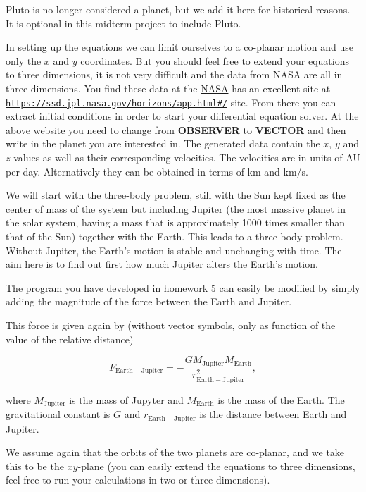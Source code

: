 \documentclass[%
oneside,                 %
final,                   %
10pt]{article}
\begin{document}
\noindent
Pluto is no longer considered a planet, but we add it here for
historical reasons. It is optional in this midterm project to include
Pluto.

In setting up the equations we can limit ourselves to a co-planar
motion and use only the $x$ and $y$ coordinates. But you should feel
free to extend your equations to three dimensions, it is not very
difficult and the data from NASA are all in three dimensions.
You find these data at the 
\href{{http://www.nasa.gov/index.html}}{NASA} has an excellent site at \href{{https://ssd.jpl.nasa.gov/horizons/app.html#/}}{\nolinkurl{https://ssd.jpl.nasa.gov/horizons/app.html\#/}} site.
From there you can extract initial conditions in order to start your
differential equation solver.  At the above website you need to change
from \textbf{OBSERVER} to \textbf{VECTOR} and then write in the planet you are
interested in.  The generated data contain the $x$, $y$ and $z$ values
as well as their corresponding velocities. The velocities are in units
of AU per day.  Alternatively they can be obtained in terms of km and
km/s.

We will start with  the three-body problem, still with the Sun kept
fixed as the center of mass of the system but including Jupiter (the
most massive planet in the solar system, having a mass that is
approximately 1000 times smaller than that of the Sun) together with
the Earth. This leads to a three-body problem. Without Jupiter, the
Earth's motion is stable and unchanging with time. The aim here is to
find out first how much Jupiter alters the Earth's motion.

The program you have developed in homework 5  can easily be modified by
simply adding the magnitude of the force between the Earth and
Jupiter.

This force is given again by (without vector symbols, only as function of the value of the relative distance)

\[
F_{\mathrm{Earth-Jupiter}}=-\frac{GM_{\mathrm{Jupiter}}M_{\mathrm{Earth}}}{r_{\mathrm{Earth-Jupiter}}^2},
\]

where $M_{\mathrm{Jupiter}}$ is the mass of Jupyter and
$M_{\mathrm{Earth}}$ is the mass of the Earth.  The gravitational constant
is $G$ and $r_{\mathrm{Earth-Jupiter}}$ is the distance between Earth
and Jupiter.

We assume again that the orbits of the two planets are co-planar, and
we take this to be the $xy$-plane (you can easily extend the equations
to three dimensions, feel free to run your calculations in two or three dimensions).
\end{document}
